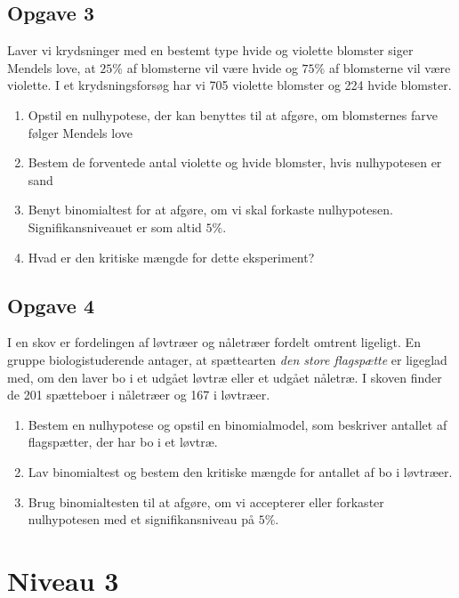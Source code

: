 \documentclass[12pt]{article}
\begin{document}
\subsection*{Opgave 3}
Laver vi krydsninger med en bestemt type hvide og violette blomster siger Mendels love, at $25\%$ af blomsterne vil være hvide og $75\%$ af blomsterne vil være violette. I et krydsningsforsøg har vi 705 violette blomster og 224 hvide blomster. 
\begin{enumerate}[label=\roman*)]
\item Opstil en nulhypotese, der kan benyttes til at afgøre, om blomsternes farve følger Mendels love
\item Bestem de forventede antal violette og hvide blomster, hvis nulhypotesen er sand
\item Benyt binomialtest for at afgøre, om vi skal forkaste nulhypotesen. Signifikansniveauet er som altid $5\%$.
\item Hvad er den kritiske mængde for dette eksperiment?
\end{enumerate}

\subsection*{Opgave 4}
I en skov er fordelingen af løvtræer og nåletræer fordelt omtrent ligeligt. En gruppe biologistuderende antager, at spættearten \textit{den store flagspætte} er ligeglad med, om den laver bo i et udgået løvtræ eller et udgået nåletræ. I skoven finder de 201 spætteboer i nåletræer og 167 i løvtræer. 
\begin{enumerate}[label=\roman*)]
\item Bestem en nulhypotese og opstil en binomialmodel, som beskriver antallet af flagspætter, der har bo i et løvtræ.
\item Lav binomialtest og bestem den kritiske mængde for antallet af bo i løvtræer.
\item Brug binomialtesten til at afgøre, om vi accepterer eller forkaster nulhypotesen med et signifikansniveau på $5\%$.

\end{enumerate}

\section*{Niveau 3}
\end{document}
